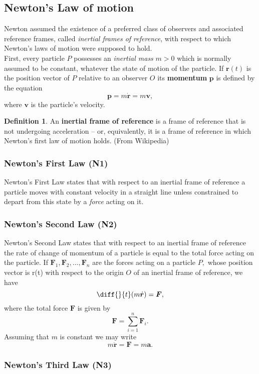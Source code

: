 \documentclass[12pt, a4paper]{article}
\theoremstyle{definition}
\newtheorem{definition}{Definition}[section]
\theoremstyle{plain}
\begin{document}
\subsection{Newton's Law of motion}


Newton assumed the existence of a preferred class of observers and associated reference frames, called \textit{inertial frames of reference}, with respect to which Newton’s laws of motion were supposed to hold. \\ First, every particle $P$ possesses an \textit{inertial mass} $m > 0$ which is normally assumed to be constant, whatever the state of motion of the particle. If $\bm{r}(t)$ is the position vector of $P$ relative to an observer $O$ its \textbf{momentum} $\bm{p}$ is defined by the equation $$\bm{p}=m\dot{\bm{r}}=m\bm{v},$$ where $\bm{v}$ is the particle's velocity.

\begin{definition}
An \textbf{inertial frame of reference} is a frame of reference that is not undergoing acceleration -- or, equivalently, it is a frame of reference in which Newton's first law of motion holds. (From Wikipedia)
\end{definition}

\subsubsection{Newton's First Law (N1)}

Newton’s First Law states that with respect to an inertial frame of reference a particle moves with constant velocity in a straight line unless constrained to depart from this state by a \textit{force} acting on it.

\subsubsection{Newton's Second Law (N2)}

Newton’s Second Law states that with respect to an inertial frame of reference the rate of change of momentum of a particle is equal to the total force acting on the particle. If $\bm{F}_1, \bm{F}_2, \ldots, \bm{F}_n$ are the forces acting on a particle $P,$ whose position vector is r(t) with respect to the origin $O$ of an inertial frame of reference, we have $$\diff{}{t}(m\dot{\bm{r}})=\bm{F},$$ where the total force $\bm{F}$ is given by $$\bm{F}=\sum_{i=1}^{n} \bm{F}_i.$$ Assuming that $m$ is constant we may write $$m\ddot{\bm{r}}=\bm{F}=m\bm{a}.$$
\subsubsection{Newton's Third Law (N3)}
\end{document}
